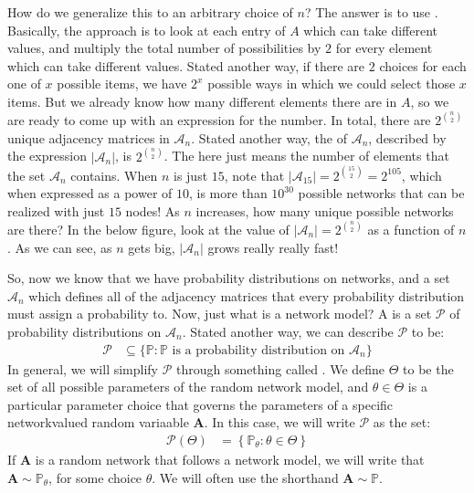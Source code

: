 \documentclass[letterpaper,10pt,english]{jupyterBook}
\begin{document}
How do we generalize this to an arbitrary choice of \(n\)? The answer is to use . Basically, the approach is to look at each entry of \(A\) which can take different values, and multiply the total number of possibilities by \(2\) for every element which can take different values. Stated another way, if there are \(2\) choices for each one of \(x\) possible items, we have \(2^x\) possible ways in which we could select those \(x\) items. But we already know how many different elements there are in \(A\), so we are ready to come up with an expression for the number. In total, there are \(2^{\binom n 2}\) unique adjacency matrices in \(\mathcal A_n\). Stated another way, the  of \(\mathcal A_n\), described by the expression \(|\mathcal A_n|\), is \(2^{\binom n 2}\). The  here just means the number of elements that the set \(\mathcal A_n\) contains. When \(n\) is just \(15\), note that \(\left|\mathcal A_{15}\right| = 2^{\binom{15}{2}} = 2^{105}\), which when expressed as a power of \(10\), is more than \(10^{30}\) possible networks that can be realized with just \(15\) nodes! As \(n\) increases, how many unique possible networks are there? In the below figure, look at the value of \(|\mathcal A_n| = 2^{\binom n 2}\) as a function of \(n\). As we can see, as \(n\) gets big, \(|\mathcal A_n|\) grows really really fast!

\noindent{}

\sphinxAtStartPar
So, now we know that we have probability distributions on networks, and a set \(\mathcal A_n\) which defines all of the adjacency matrices that every probability distribution must assign a probability to. Now, just what is a network model? A  is a set \(\mathcal P\) of probability distributions on \(\mathcal A_n\). Stated another way, we can describe \(\mathcal P\) to be:
\begin{align*}
    \mathcal P &\subseteq \{\mathbb P: \mathbb P\textrm{ is a probability distribution on }\mathcal A_n\}
\end{align*}
\sphinxAtStartPar
In general, we will simplify \(\mathcal P\) through something called . We define \(\Theta\) to be the set of all possible parameters of the random network model, and \(\theta \in \Theta\) is a particular parameter choice that governs the parameters of a specific network\sphinxhyphen{}valued random variaable \(\mathbf A\). In this case, we will write \(\mathcal P\) as the set:
\begin{align*}
    \mathcal P(\Theta) &= \left\{\mathbb P_\theta : \theta \in \Theta\right\}
\end{align*}
\sphinxAtStartPar
If \(\mathbf A\) is a random network that follows a network model, we will write that \(\mathbf A \sim \mathbb P_\theta\), for some choice \(\theta\). We will often use the shorthand \(\mathbf A \sim \mathbb P\).
\end{document}
